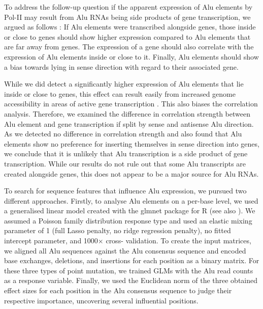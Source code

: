 \noindent To address\label{mar:alucor} the
follow-up question if the apparent expression of Alu elements by Pol-II may
result from Alu RNAs being side products of gene transcription, we argued as
follows \citep{Conti2015a,Zhang2019}: If Alu elements were transcribed
alongside genes, those inside or close to genes should show higher expression
compared to Alu elements that are far away from genes. The expression of a
gene should also correlate with the expression of Alu elements inside or close
to it. Finally, Alu elements should show a bias towards lying in sense
direction with regard to their associated gene.

While we did detect a significantly higher expression of Alu elements that lie
inside or close to genes, this effect can result easily from increased genome
accessibility in areas of active gene transcription \citep{Guo2016}. This also
biases the correlation analysis. Therefore, we examined the difference in
correlation strength between Alu element and gene transcription if split by
sense and antisense Alu direction. As we detected no difference in correlation
strength and also found that Alu elements show no preference for inserting
themselves in sense direction into genes, we conclude that it is unlikely that
Alu transcription is a side product of gene transcription. While our results
do not rule out that some Alu transcripts are created alongside genes, this
does not appear to be a major source for Alu RNAs.
\bigbreak

\noindent To search\label{mar:aluglm}
for sequence features that influence Alu expression, we pursued two different
approaches. Firstly, to analyse Alu elements on a per-base level, we used a
generalised linear model created with the glmnet package for R
\citep{Nelder1972, Friedman2010} (see also ). We
assumed a Poisson family distribution response type and used an elastic mixing
parameter \textalpha{} of \num{1} (full Lasso penalty, no ridge regression
penalty), no fitted intercept parameter, and \num{1000}$\times$ cross-%
validation. To create the input matrices, we aligned all Alu sequences against
the Alu consensus sequence and encoded base exchanges, deletions, and
insertions for each position as a binary matrix. For these three types of
point mutation, we trained GLMs with the Alu read counts as a response
variable. Finally, we used the Euclidean norm of the three obtained effect
sizes for each position in the Alu consensus sequence to judge their
respective importance, uncovering several influential positions.
\bigbreak

